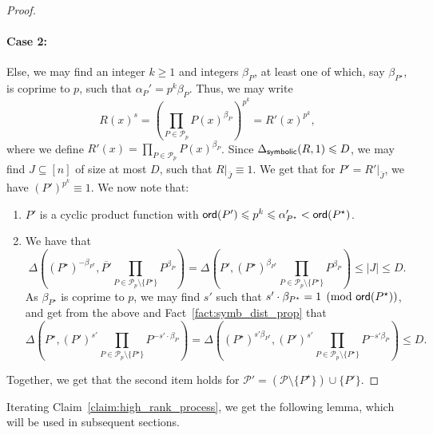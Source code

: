 \documentclass[11pt]{article}
\newcommand\card[1]{\left| {#1} \right|}
\renewcommand\geq{\geqslant}
\renewcommand\leq{\leqslant}
\begin{document}
\begin{proof}
        \paragraph{Case 2:} Else, we may find an integer $k\geq 1$ and integers  $\beta_P$, at least one of which, say $\beta_{P^{\star}}$, is coprime to $p$, such that $\alpha_P' = p^k \beta_P$. Thus, we may write
        \[
        R(x)^{s} 
        = \left(\prod\limits_{P\in \mathcal{P}_p}P(x)^{\beta_P}\right)^{p^k} = 
        R'(x)^{p^k},
        \]
        where we define $R'(x)=\prod\limits_{P\in \mathcal{P}_p}P(x)^{\beta_P}$. Since $\Delta_{{\sf symbolic}}(R,1)\leq D$, we may find $J\subseteq [n]$ of size at most $D$, such that $R|_{\bar{J}}\equiv 1$. We get that for $P' = R'|_{\bar{J}}$, we have $(P')^{p^{k}}\equiv 1$. We now note that:
        \begin{enumerate}
        \item $P'$ is a cyclic product function with ${\sf ord}(P') \leq p^{k}\leq \alpha_{P^{\star}}' < {\sf ord}(P^{\star})$.
        \item We have that
        \[
            \Delta\left((P^{\star})^{-\beta_{P^{\star}}},
            \overline{P'}\prod\limits_{P\in\mathcal{P}_{p}\setminus\{P^{\star}\}} P^{\beta_P}\right)
            =
            \Delta\left(P', (P^{\star})^{\beta_{P^{\star}}}
            \prod\limits_{P\in\mathcal{P}_{p}\setminus\{P^{\star}\}} P^{\beta_P}\right)
            \leq \card{J}\leq D.
        \]
        As $\beta_{P^{\star}}$ is coprime to $p$, we may find $s'$ such that $s'\cdot \beta_{P^{\star}}=1\pmod{{\sf ord}(P^{\star})}$, and get from the above and Fact~\ref{fact:symb_dist_prop} that
        \[
        \Delta
        \left(P^{\star},
            (P')^{s'}\prod\limits_{P\in\mathcal{P}_{p}\setminus\{P^{\star}\}} P^{-s'\cdot\beta_P}\right)
            =
            \Delta\left((P^{\star})^{s'\beta_{P^{\star}}},(P')^{s'}\prod\limits_{P\in\mathcal{P}_{p}\setminus\{P^{\star}\}} P^{-s'\beta_P}\right)
            \leq D.
        \]
        \end{enumerate}
        Together, we get that the second item holds for $\mathcal{P}'=
        (\mathcal{P}\setminus\{P^{\star}\})\cup\{P'\}$.
    \end{proof}
    Iterating Claim~\ref{claim:high_rank_process}, we get the following lemma, which will be used in subsequent sections.
\end{document}
